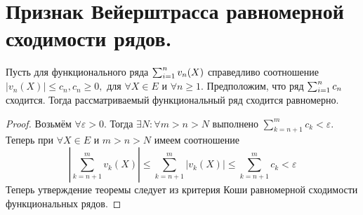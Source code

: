 \documentclass[main]{subfiles}
\begin{document}
\section{Признак Вейерштрасса равномерной сходимости рядов.}
\begin{theorem}
     Пусть для функционального ряда $\sum^n_{i=1} v_n(X) $ справедливо соотношение
      $|v_n(X)|\leq c_n, c_n\geq 0,$ для $\forall X\in E$ и $\forall n\geq 1.$ 
      Предположим, что ряд $\sum^n_{i=1} c_n$ сходится. Тогда рассматриваемый функциональный ряд сходится равномерно.\end{theorem}
\begin{proof} 
    Возьмём $\forall \varepsilon >0.$ Тогда $\exists N: \forall m>n>N$ выполнено $\sum_{k=n+1}^m c_k<\varepsilon$. 
    Теперь при $\forall X\in E$ и $m>n>N$ имеем соотношение 
    \[ |\sum_{k=n+1}^m v_k(X)|\leq \sum_{k=n+1}^m |v_k(X)|\leq \sum_{k=n+1}^m c_k<\varepsilon \]
Теперь утверждение теоремы следует из критерия Коши равномерной сходимости функциональных рядов. \end{proof}
\end{document}

